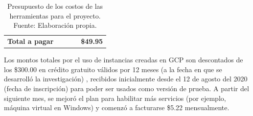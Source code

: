 \begin{table}[h!]
\begin{tabular}{llrrr}
		\rowcolor[HTML]{303498} 
		{\color[HTML]{FFFFFF} \textbf{Total a pagar}}                                    & {\color[HTML]{FFFFFF} }                                                              & \multicolumn{1}{l}{\cellcolor[HTML]{303498}{\color[HTML]{FFFFFF} }}                         & \multicolumn{1}{l}{\cellcolor[HTML]{303498}}                                      & {\color[HTML]{FFFFFF} \textbf{\$49.95}}                                             
	\end{tabular}
	\caption{Presupuesto de los costos de las herramientas para el proyecto. Fuente: Elaboración propia.}
	\label{3:table4}
\end{table}

Los montos totales por el uso de instancias creadas en GCP son descontados de los \$300.00 en crédito gratuito válidos por 12 meses (a la fecha en que se desarrolló la investigación) \parencite{ot_googlecloud_freetrial}, recibidos inicialmente desde el 12 de agosto del 2020 (fecha de inscripción) para poder ser usados como versión de prueba. A partir del siguiente mes, se mejoró el plan para habilitar más servicios (por ejemplo, máquina virtual en Windows) y comenzó a facturarse \$5.22 mensualmente.